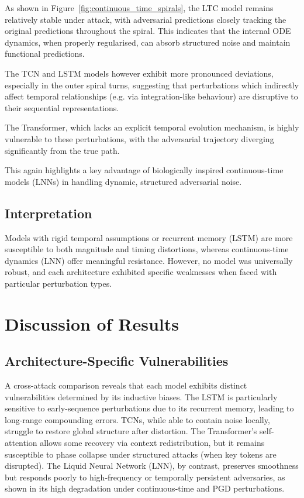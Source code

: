 As shown in Figure~\ref{fig:continuous_time_spirals}, the LTC model remains relatively stable under attack, with adversarial predictions closely tracking the original predictions throughout the spiral. This indicates that the internal ODE dynamics, when properly regularised, can absorb structured noise and maintain functional predictions.

The TCN and LSTM models however exhibit more pronounced deviations, especially in the outer spiral turns, suggesting that perturbations which indirectly affect temporal relationships (e.g. via integration-like behaviour) are disruptive to their sequential representations.

The Transformer, which lacks an explicit temporal evolution mechanism, is highly vulnerable to these perturbations, with the adversarial trajectory diverging significantly from the true path.

This again highlights a key advantage of biologically inspired continuous-time models (LNNs) in handling dynamic, structured adversarial noise.

\subsection*{Interpretation}

Models with rigid temporal assumptions or recurrent memory (LSTM) are more susceptible to both magnitude and timing distortions, whereas continuous-time dynamics (LNN) offer meaningful resistance. However, no model was universally robust, and each architecture exhibited specific weaknesses when faced with particular perturbation types.

\section{Discussion of Results}

\subsection*{Architecture-Specific Vulnerabilities}

A cross-attack comparison reveals that each model exhibits distinct vulnerabilities determined by its inductive biases. The LSTM is particularly sensitive to early-sequence perturbations due to its recurrent memory, leading to long-range compounding errors. TCNs, while able to contain noise locally, struggle to restore global structure after distortion. The Transformer's self-attention allows some recovery via context redistribution, but it remains susceptible to phase collapse under structured attacks (when key tokens are disrupted). The Liquid Neural Network (LNN), by contrast, preserves smoothness but responds poorly to high-frequency or temporally persistent adversaries, as shown in its high degradation under continuous-time and PGD perturbations.

